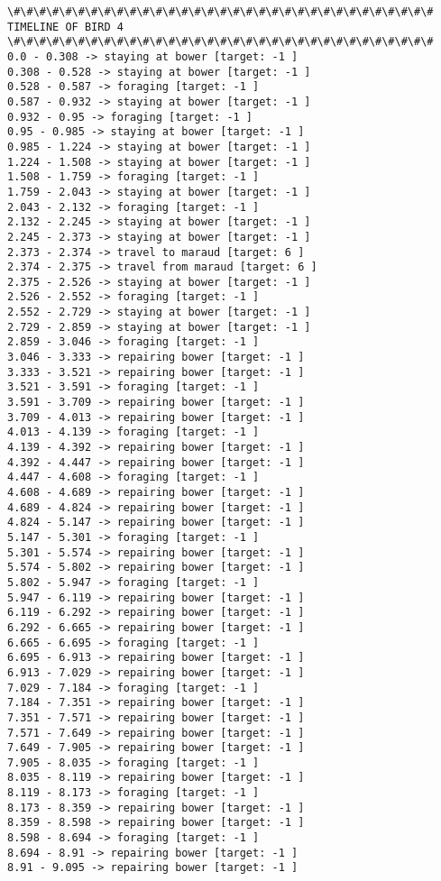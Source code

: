 \documentclass[11pt]{article}
\begin{document}
\begin{Verbatim}[commandchars=\\\{\}]
\#\#\#\#\#\#\#\#\#\#\#\#\#\#\#\#\#\#\#\#\#\#\#\#\#\#\#\#\#\#\#\#\#
TIMELINE OF BIRD 4
\#\#\#\#\#\#\#\#\#\#\#\#\#\#\#\#\#\#\#\#\#\#\#\#\#\#\#\#\#\#\#\#\#
0.0 - 0.308 -> staying at bower [target: -1 ]
0.308 - 0.528 -> staying at bower [target: -1 ]
0.528 - 0.587 -> foraging [target: -1 ]
0.587 - 0.932 -> staying at bower [target: -1 ]
0.932 - 0.95 -> foraging [target: -1 ]
0.95 - 0.985 -> staying at bower [target: -1 ]
0.985 - 1.224 -> staying at bower [target: -1 ]
1.224 - 1.508 -> staying at bower [target: -1 ]
1.508 - 1.759 -> foraging [target: -1 ]
1.759 - 2.043 -> staying at bower [target: -1 ]
2.043 - 2.132 -> foraging [target: -1 ]
2.132 - 2.245 -> staying at bower [target: -1 ]
2.245 - 2.373 -> staying at bower [target: -1 ]
2.373 - 2.374 -> travel to maraud [target: 6 ]
2.374 - 2.375 -> travel from maraud [target: 6 ]
2.375 - 2.526 -> staying at bower [target: -1 ]
2.526 - 2.552 -> foraging [target: -1 ]
2.552 - 2.729 -> staying at bower [target: -1 ]
2.729 - 2.859 -> staying at bower [target: -1 ]
2.859 - 3.046 -> foraging [target: -1 ]
3.046 - 3.333 -> repairing bower [target: -1 ]
3.333 - 3.521 -> repairing bower [target: -1 ]
3.521 - 3.591 -> foraging [target: -1 ]
3.591 - 3.709 -> repairing bower [target: -1 ]
3.709 - 4.013 -> repairing bower [target: -1 ]
4.013 - 4.139 -> foraging [target: -1 ]
4.139 - 4.392 -> repairing bower [target: -1 ]
4.392 - 4.447 -> repairing bower [target: -1 ]
4.447 - 4.608 -> foraging [target: -1 ]
4.608 - 4.689 -> repairing bower [target: -1 ]
4.689 - 4.824 -> repairing bower [target: -1 ]
4.824 - 5.147 -> repairing bower [target: -1 ]
5.147 - 5.301 -> foraging [target: -1 ]
5.301 - 5.574 -> repairing bower [target: -1 ]
5.574 - 5.802 -> repairing bower [target: -1 ]
5.802 - 5.947 -> foraging [target: -1 ]
5.947 - 6.119 -> repairing bower [target: -1 ]
6.119 - 6.292 -> repairing bower [target: -1 ]
6.292 - 6.665 -> repairing bower [target: -1 ]
6.665 - 6.695 -> foraging [target: -1 ]
6.695 - 6.913 -> repairing bower [target: -1 ]
6.913 - 7.029 -> repairing bower [target: -1 ]
7.029 - 7.184 -> foraging [target: -1 ]
7.184 - 7.351 -> repairing bower [target: -1 ]
7.351 - 7.571 -> repairing bower [target: -1 ]
7.571 - 7.649 -> repairing bower [target: -1 ]
7.649 - 7.905 -> repairing bower [target: -1 ]
7.905 - 8.035 -> foraging [target: -1 ]
8.035 - 8.119 -> repairing bower [target: -1 ]
8.119 - 8.173 -> foraging [target: -1 ]
8.173 - 8.359 -> repairing bower [target: -1 ]
8.359 - 8.598 -> repairing bower [target: -1 ]
8.598 - 8.694 -> foraging [target: -1 ]
8.694 - 8.91 -> repairing bower [target: -1 ]
8.91 - 9.095 -> repairing bower [target: -1 ]

\end{Verbatim}
\end{document}
